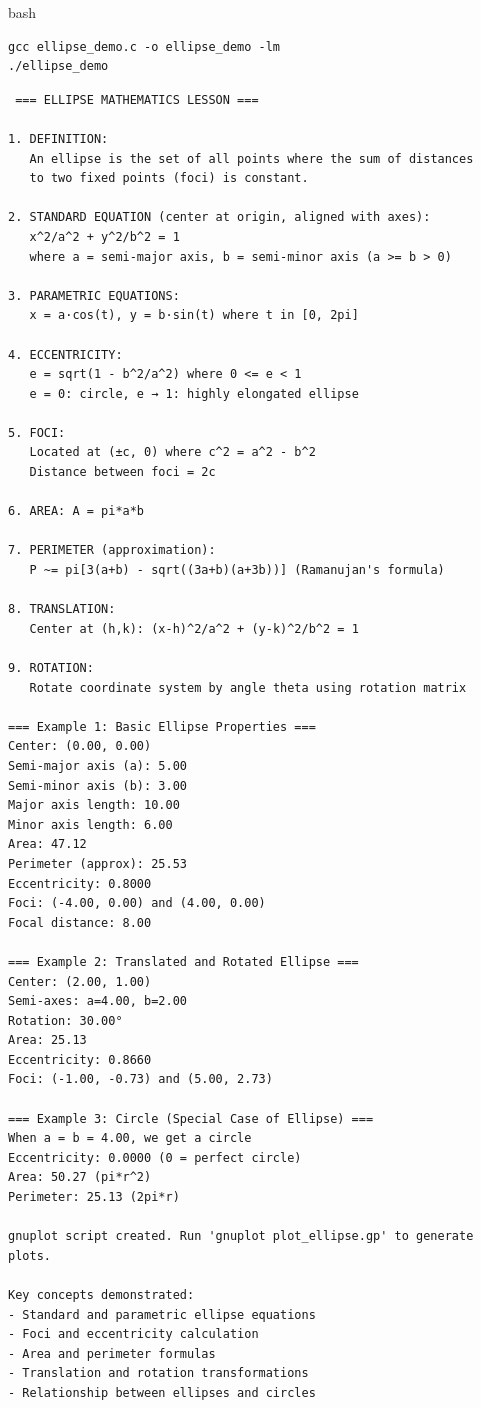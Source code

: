 \documentclass[a4paper,10pt]{article}
\begin{document}
bash\\
\begin{verbatim}
gcc ellipse_demo.c -o ellipse_demo -lm
./ellipse_demo
\end{verbatim}
\clearpage
\begin{verbatim}
 === ELLIPSE MATHEMATICS LESSON ===

1. DEFINITION:
   An ellipse is the set of all points where the sum of distances
   to two fixed points (foci) is constant.

2. STANDARD EQUATION (center at origin, aligned with axes):
   x^2/a^2 + y^2/b^2 = 1
   where a = semi-major axis, b = semi-minor axis (a >= b > 0)

3. PARAMETRIC EQUATIONS:
   x = a·cos(t), y = b·sin(t) where t in [0, 2pi]

4. ECCENTRICITY:
   e = sqrt(1 - b^2/a^2) where 0 <= e < 1
   e = 0: circle, e → 1: highly elongated ellipse

5. FOCI:
   Located at (±c, 0) where c^2 = a^2 - b^2
   Distance between foci = 2c

6. AREA: A = pi*a*b

7. PERIMETER (approximation):
   P ~= pi[3(a+b) - sqrt((3a+b)(a+3b))] (Ramanujan's formula)

8. TRANSLATION:
   Center at (h,k): (x-h)^2/a^2 + (y-k)^2/b^2 = 1

9. ROTATION:
   Rotate coordinate system by angle theta using rotation matrix

=== Example 1: Basic Ellipse Properties ===
Center: (0.00, 0.00)
Semi-major axis (a): 5.00
Semi-minor axis (b): 3.00
Major axis length: 10.00
Minor axis length: 6.00
Area: 47.12
Perimeter (approx): 25.53
Eccentricity: 0.8000
Foci: (-4.00, 0.00) and (4.00, 0.00)
Focal distance: 8.00

=== Example 2: Translated and Rotated Ellipse ===
Center: (2.00, 1.00)
Semi-axes: a=4.00, b=2.00
Rotation: 30.00°
Area: 25.13
Eccentricity: 0.8660
Foci: (-1.00, -0.73) and (5.00, 2.73)

=== Example 3: Circle (Special Case of Ellipse) ===
When a = b = 4.00, we get a circle
Eccentricity: 0.0000 (0 = perfect circle)
Area: 50.27 (pi*r^2)
Perimeter: 25.13 (2pi*r)

gnuplot script created. Run 'gnuplot plot_ellipse.gp' to generate plots.

Key concepts demonstrated:
- Standard and parametric ellipse equations
- Foci and eccentricity calculation
- Area and perimeter formulas
- Translation and rotation transformations
- Relationship between ellipses and circles
\end{verbatim}
\end{document}
